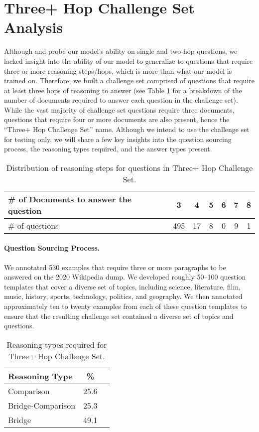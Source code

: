 \section{Three+ Hop Challenge Set Analysis} \label{sec:three_hop}
Although \squadopen{} and \hotpotqa{} probe our model's ability on single and two-hop questions, we lacked insight into the ability of our model to generalize to questions that require three or more reasoning steps/hops, which is more than what our model is trained on. 
Therefore, we built a challenge set comprised of questions that require at least three hops of reasoning to answer (see Table \ref{tab:hops-stats} for a breakdown of the number of documents required to answer each question in the challenge set). While the vast majority of challenge set questions require three documents, questions that require four or more documents are also present, hence the ``Three+ Hop Challenge Set'' name.
Although we intend to use the challenge set for testing only, we will share a few key insights into the question sourcing process, the reasoning types required, and the answer types present.

\begin{table}
\small
\begin{tabular}{p{2.5cm}cccccc}
\toprule
\# of Documents to answer the question & 3 & 4 & 5 & 6 & 7 & 8\\
\midrule
\# of questions & 495 & 17 & 8 & 0 & 9 & 1\\
\bottomrule
\end{tabular}

\caption{Distribution of reasoning steps for questions in Three+ Hop Challenge Set.} \label{tab:hops-stats}
\end{table}

\paragraph{Question Sourcing Process.}
We annotated 530 examples that require three or more paragraphs to be answered on the 2020 Wikipedia dump. 
We developed roughly 50--100 question templates that cover a diverse set of topics, including science, literature, film, music, history, sports, technology, politics, and geography. 
We then annotated approximately ten to twenty examples from each of these question templates to ensure that the resulting challenge set contained a diverse set of topics and questions.

\begin{table}
    \centering
\begin{tabular}{lcc}
\toprule
Reasoning Type    & \%   \\ 
\midrule
Comparison        & 25.6 \\
Bridge-Comparison &  25.3 \\
Bridge            & 49.1 \\
\bottomrule
\end{tabular}

\caption{Reasoning types required for Three+ Hop Challenge Set.}
\label{tab:three_hop_reasoning_types}
\end{table}


